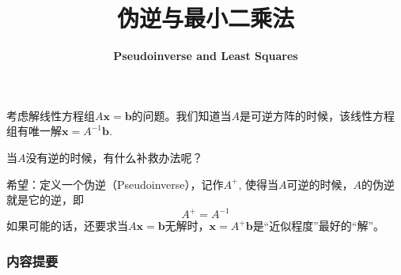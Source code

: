 



\title[Pseudoinverse and Least Squares]{\LARGE \bfseries 伪逆与最小二乘法} %
\author[Pseudoinverse and Least Squares] %
{\Large \bfseries Pseudoinverse and Least Squares}
\date{}






\begin{frame}

\titlepage %

\end{frame}


\begin{frame}

考虑解线性方程组$A\mathbf{x} = \mathbf{b}$的问题。我们知道当$A$是可逆方阵的时候，该线性方程组有唯一解$\mathbf{x} = A^{-1}\mathbf{b}$.

\vspace{1em}

当$A$没有逆的时候，有什么补救办法呢？

\vspace{1em}

希望：定义一个伪逆（Pseudoinverse），记作$A^+$, 使得当$A$可逆的时候，$A$的伪逆就是它的逆，即
$$A^+ = A^{-1}$$
如果可能的话，还要求当$A\mathbf{x} = \mathbf{b}$无解时，$\mathbf{x} = A^+\mathbf{b}$是``近似程度''最好的``解''。

\end{frame}


\begin{frame}
\frametitle{内容提要} %
\tableofcontents %
\end{frame}

